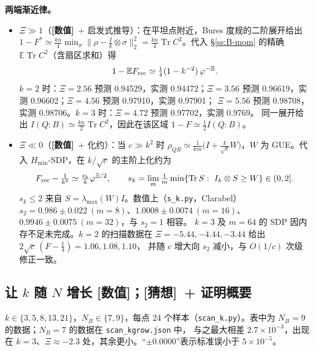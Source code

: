 \documentclass[11pt,a4paper,UTF8]{ctexart}
\newcommand{\Tr}{\operatorname{Tr}}
\newcommand{\E}{\mathbb{E}}
\newcommand{\Frec}{F_{\rm rec}}
\newcommand{\code}[1]{\texttt{#1}}
\newcommand{\tagN}{\texorpdfstring{\textcolor{cN}{\textbf{[数值]}}}{[数值]}}
\newcommand{\tagC}{\texorpdfstring{\textcolor{cC}{\textbf{[猜想]}}}{[猜想]}}
\begin{document}
\noindent\textbf{两端渐近律。}
\begin{itemize}
  \item \textbf{$\Xi\gg1$}（\tagN\ + 启发式推导）：在平坦点附近，Bures 度规的二阶展开给出
  $1-F^{*}\simeq\frac{kn}{4}\min_\sigma\|\rho-\frac Ik\otimes\sigma\|_2^2=\frac{kn}{4}\Tr C^2$。代入 \S\ref{ss:B-mom} 的精确 $\E\Tr C^2$（含扇区求和）得
  \[
  1-\E\Frec\simeq\tfrac14(1-k^{-2})\,\varphi^{-\Xi}.
  \]
  $k=2$ 时：$\Xi=2.56$ 预测 0.94529，实测 0.94472；$\Xi=3.56$ 预测 0.96619，实测 0.96602；$\Xi=4.56$ 预测 0.97910，实测 0.97901；
  $\Xi=5.56$ 预测 0.98708，实测 0.98706。$k=3$ 时：$\Xi=4.72$ 预测 0.97702，实测 0.9769。
  同一展开给出 $I(Q\!:\!B)\simeq\frac{kn}{2}\Tr C^2$，因此在该区域 $1-F\simeq\tfrac12 I(Q\!:\!B)$。
  \item \textbf{$\Xi\ll0$}（\tagN\ + 化约）：当 $c\gg k^2$ 时 $\rho_{QR}\simeq\frac1{km}\big(I+\frac{k}{\sqrt c}W\big)$，$W$ 为 GUE。代入 $H_{\min}$-SDP，在 $k/\sqrt c$ 的主阶上化约为
  \[
  \Frec-\tfrac1{k^2}\simeq\tfrac{s_k}{k}\varphi^{\Xi/2},\qquad s_k=\lim_m\tfrac1m\min\{\Tr S:\ I_k\otimes S\ge W\}\in(0,2].
  \]
  $s_k\le2$ 来自 $S=\lambda_{\max}(W)I$。数值上（\code{s\_k.py}，Clarabel）$s_2=0.986\pm0.022\ (m=8)$、$1.0008\pm0.0074\ (m=16)$、$0.9946\pm0.0075\ (m=32)$，与 $s_2=1$ 相容。
  $k=3$ 及 $m=64$ 的 SDP 因内存不足未完成。$k=2$ 的扫描数据在 $\Xi=-5.44,-4.44,-3.44$ 给出 $2\sqrt c\,(F-\tfrac14)=1.06,1.08,1.10$，
  并随 $c$ 增大向 $s_2$ 减小，与 $O(1/c)$ 次级修正一致。
\end{itemize}

\subsection{让 \texorpdfstring{$k$}{k} 随 \texorpdfstring{$N$}{N} 增长 \tagN；\tagC\ + 证明概要}\label{ss:C-kgrow}
$k\in\{3,5,8,13,21\}$，$N_B\in\{7,9\}$，每点 24 个样本（\code{scan\_k.py}）。表中为 $N_B=9$ 的数据；$N_B=7$ 的数据在 \code{scan\_kgrow.json} 中，
与之最大相差 $2.7\times10^{-3}$，出现在 $k=3$、$\Xi\approx-2.3$ 处，其余更小。“$\pm0.0000$”表示标准误小于 $5\times10^{-5}$。
\end{document}
